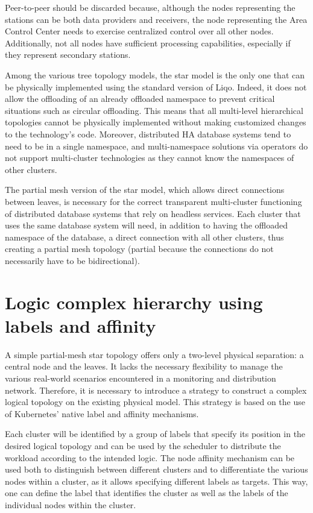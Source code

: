 Peer-to-peer should be discarded because, although the nodes representing the stations can be both data providers and receivers, the node representing the Area Control Center needs to exercise centralized control over all other nodes. Additionally, not all nodes have sufficient processing capabilities, especially if they represent secondary stations.

Among the various tree topology models, the star model is the only one that can be physically implemented using the standard version of Liqo. Indeed, it does not allow the offloading of an already offloaded namespace to prevent critical situations such as circular offloading. This means that all multi-level hierarchical topologies cannot be physically implemented without making customized changes to the technology's code. Moreover, distributed HA database systems tend to need to be in a single namespace, and multi-namespace solutions via operators do not support multi-cluster technologies as they cannot know the namespaces of other clusters.

The partial mesh version of the star model, which allows direct connections between leaves, is necessary for the correct transparent multi-cluster functioning of distributed database systems that rely on headless services. Each cluster that uses the same database system will need, in addition to having the offloaded namespace of the database, a direct connection with all other clusters, thus creating a partial mesh topology (partial because the connections do not necessarily have to be bidirectional).

\section{Logic complex hierarchy using labels and affinity}
A simple partial-mesh star topology offers only a two-level physical separation: a central node and the leaves. It lacks the necessary flexibility to manage the various real-world scenarios encountered in a monitoring and distribution network. Therefore, it is necessary to introduce a strategy to construct a complex logical topology on the existing physical model. This strategy is based on the use of Kubernetes' native label and affinity mechanisms.

Each cluster will be identified by a group of labels that specify its position in the desired logical topology and can be used by the scheduler to distribute the workload according to the intended logic. The node affinity mechanism can be used both to distinguish between different clusters and to differentiate the various nodes within a cluster, as it allows specifying different labels as targets. This way, one can define the label that identifies the cluster as well as the labels of the individual nodes within the cluster.

